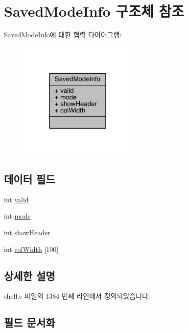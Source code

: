 \hypertarget{struct_saved_mode_info}{}\section{Saved\+Mode\+Info 구조체 참조}
\label{struct_saved_mode_info}


Saved\+Mode\+Info에 대한 협력 다이어그램\+:
\nopagebreak
\begin{figure}[H]
\begin{center}
\leavevmode
\includegraphics[width=166pt]{d4/dab/struct_saved_mode_info__coll__graph}
\end{center}
\end{figure}
\subsection*{데이터 필드}
\begin{DoxyCompactItemize}
\item 
int \hyperlink{struct_saved_mode_info_a43e863fb285c2aad913087572ebd5e27}{valid}
\item 
int \hyperlink{struct_saved_mode_info_ab6d30b28565d51ca017904f70b5edac6}{mode}
\item 
int \hyperlink{struct_saved_mode_info_a73fa5b451f94fa75fb5e27887831b8f4}{show\+Header}
\item 
int \hyperlink{struct_saved_mode_info_add96e86a9293b5e1bfd3ab92bf1a365f}{col\+Width} \mbox{[}100\mbox{]}
\end{DoxyCompactItemize}


\subsection{상세한 설명}


shell.\+c 파일의 1384 번째 라인에서 정의되었습니다.



\subsection{필드 문서화}
\mbox{\label{struct_saved_mode_info_add96e86a9293b5e1bfd3ab92bf1a365f}} 
